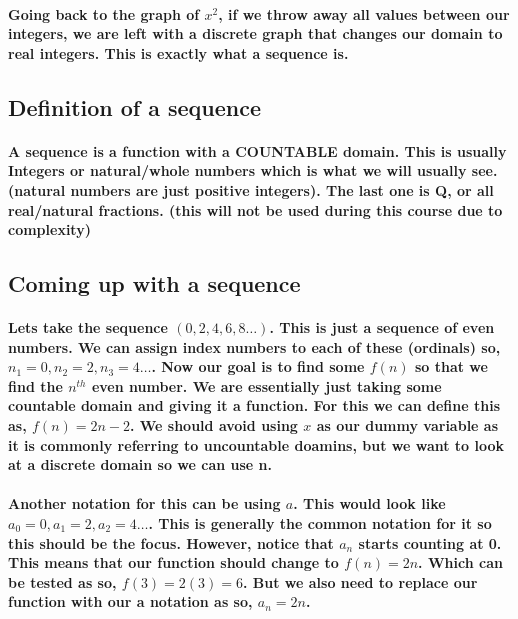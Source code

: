 \documentclass[a4paper]{article}
\begin{document}
\paragraph{Going back to the graph of $x^2$, if we throw away all values between our integers, we are left with a discrete graph that changes our domain to real integers. This is exactly what a sequence is. }

\subsection{Definition of a sequence}%
\label{sub:Definition of a sequence}
\paragraph{A sequence is a function with a COUNTABLE domain. This is usually Integers or natural/whole numbers which is what we will usually see. (natural numbers are just positive integers). The last one is Q, or all real/natural fractions. (this will not be used during this course due to complexity) }

\newpage
\subsection{Coming up with a sequence}%
\label{sub:Coming up with a sequence}
\paragraph{Lets take the sequence $\left( 0,2,4,6,8 \ldots \right) $. This is just a sequence of even numbers. We can assign index numbers to each of these (ordinals) so, $n_1 = 0, n_2 = 2, n_3 = 4 \ldots$. Now our goal is to find some $f\left( n \right) $ so that we find the $n^{th}$ even number. We are essentially just taking some countable domain and giving it a function. For this we can define this as, $f\left( n \right) =2n-2$. We should avoid using $x$ as our dummy variable as it is commonly referring to uncountable doamins, but we want to look at a discrete domain so we can use n. }

\paragraph{Another notation for this can be using $a$. This would look like $a_0 = 0, a_1 = 2, a_2 = 4 \ldots$. This is generally the common notation for it so this should be the focus. However, notice that $a_n$ starts counting at 0. This means that our function should change to $f\left( n \right) =2n$. Which can be tested as so, $f\left( 3 \right) =2\left( 3 \right) =6$. But we also need to replace our function with our a notation as so, $a_n=2n$. }
\end{document}
